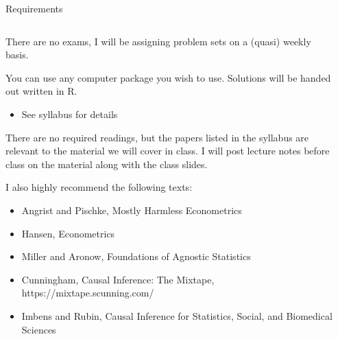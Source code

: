 \documentclass[notes,11pt, aspectratio=169]{beamer}
\newenvironment{wideitemize}{\itemize\addtolength{\itemsep}{10pt}}{\enditemize}
\begin{document}
\begin{frame}{Requirements }
\begin{columns}[T] %
\begin{column}{.9\textwidth}
  \begin{wideitemize}
  \item There are no exams, I will be assigning problem sets on a (quasi) weekly basis.
  \item You can use any computer package you wish to use. Solutions will be handed out written in R. 
    \begin{itemize}
    \item See syllabus for details
    \end{itemize}
  \item There are no required readings, but the papers listed in the    syllabus are relevant to the material we will cover in class. I will post lecture notes before class on the material along with the class slides.
  \item I also highly recommend the following texts:
    \begin{itemize}
    \item Angrist and  Pischke, Mostly Harmless Econometrics
    \item Hansen, Econometrics
    \item Miller and Aronow, Foundations of Agnostic Statistics
    \item Cunningham, Causal Inference: The Mixtape, https://mixtape.scunning.com/
    \item Imbens and Rubin, Causal Inference for Statistics, Social, and Biomedical Sciences      
    \end{itemize}
  \end{wideitemize}
\end{column}%
\hfill%
\begin{column}{.38\textwidth}
  \makebox[\linewidth][c]{
    \resizebox{\linewidth}{!}{
    }
  }
\end{column}%
\end{columns}
\end{frame}
\end{document}
